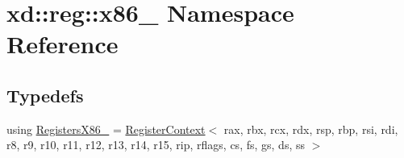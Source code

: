 \hypertarget{namespacexd_1_1reg_1_1x86__64}{}\section{xd\+:\+:reg\+:\+:x86\+\_ Namespace Reference}
\label{namespacexd_1_1reg_1_1x86__64}
\subsection*{Typedefs}
\begin{DoxyCompactItemize}
\item 
using \mbox{\hyperlink{namespacexd_1_1reg_1_1x86__64_a3a7f77ab982b8a5833111da7ceccafeb}{Registers\+X86\+\_}} = \mbox{\hyperlink{namespacexd_1_1reg_ab6608c02ef554f7a9a48519600fb6707}{Register\+Context}}$<$ rax, rbx, rcx, rdx, rsp, rbp, rsi, rdi, r8, r9, r10, r11, r12, r13, r14, r15, rip, rflags, cs, fs, gs, ds, ss $>$
\end{DoxyCompactItemize}
